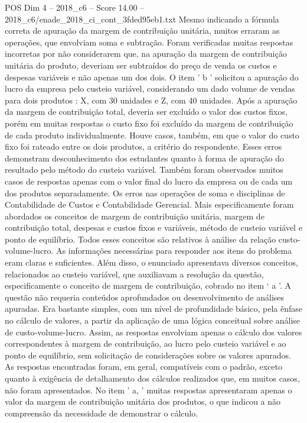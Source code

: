 \begin{textsample}{POS Dim 4 – 2018\_c6 – Score 14.00 – 2018\_c6/enade\_2018\_ci\_cont\_3fded95eb1.txt}
Mesmo indicando a fórmula correta de apuração da margem de contribuição unitária, muitos erraram as operações, que envolviam soma e subtração.
Foram verificadas muitas respostas incorretas por não considerarem que, na apuração da margem de contribuição unitária do produto, deveriam ser subtraídos do preço de venda os custos e despesas variáveis e não apenas um dos dois.
O item ' b ' solicitou a apuração do lucro da empresa pelo custeio variável, considerando um dado volume de vendas para dois produtos : X, com 30 unidades e Z, com 40 unidades.
Após a apuração da margem de contribuição total, deveria ser excluído o valor dos custos fixos, porém em muitas respostas o custo fixo foi excluído da margem de contribuição de cada produto individualmente.
Houve casos, também, em que o valor do custo fixo foi rateado entre os dois produtos, a critério do respondente.
Esses erros demonstram desconhecimento dos estudantes quanto à forma de apuração do resultado pelo método do custeio variável.
Também foram observados muitos casos de respostas apenas com o valor final do lucro da empresa ou de cada um dos produtos separadamente.
Os erros nas operações de soma e disciplinas de Contabilidade de Custos e Contabilidade Gerencial.
Mais especificamente foram abordados os conceitos de margem de contribuição unitária, margem de contribuição total, despesas e custos fixos e variáveis, método de custeio variável e ponto de equilíbrio.
Todos esses conceitos são relativos à análise da relação custo-volume-lucro.
As informações necessárias para responder aos itens do problema eram claras e suficientes.
Além disso, o enunciado apresentava diversos conceitos, relacionados ao custeio variável, que auxiliavam a resolução da questão, especificamente o conceito de margem de contribuição, cobrado no item ‘ a ’.
A questão não requeria conteúdos aprofundados ou desenvolvimento de análises apuradas.
Era bastante simples, com um nível de profundidade básico, pela ênfase no cálculo de valores, a partir da aplicação de uma lógica conceitual sobre análise de custo-volume-lucro.
Assim, as respostas envolviam apenas o cálculo dos valores correspondentes à margem de contribuição, ao lucro pelo custeio variável e ao ponto de equilíbrio, sem solicitação de considerações sobre os valores apurados.
As respostas encontradas foram, em geral, compatíveis com o padrão, exceto quanto à exigência de detalhamento dos cálculos realizados que, em muitos casos, não foram apresentados.
No item ' a, ' muitas respostas apresentaram apenas o valor da margem de contribuição unitária dos produtos, o que indicou a não compreensão da necessidade de demonstrar o cálculo.

\end{textsample}
